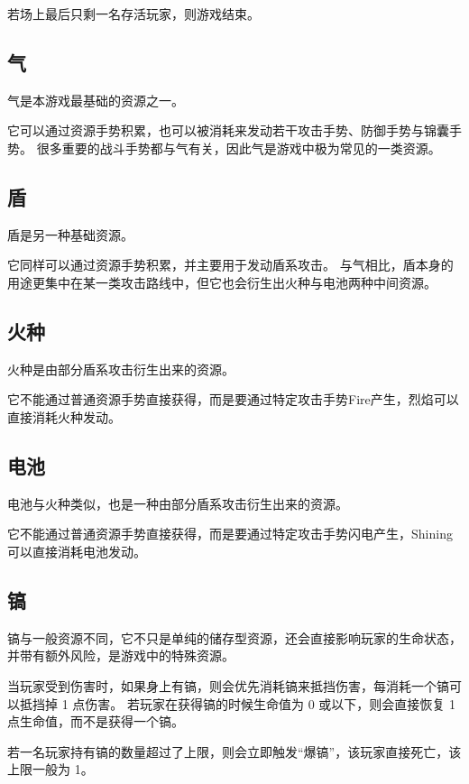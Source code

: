 \documentclass[12pt]{ctexart}
\begin{document}
若场上最后只剩一名存活玩家，则游戏结束。

\subsection{气}

气是本游戏最基础的资源之一。

它可以通过资源手势积累，也可以被消耗来发动若干攻击手势、防御手势与锦囊手势。
很多重要的战斗手势都与气有关，因此气是游戏中极为常见的一类资源。

\subsection{盾}

盾是另一种基础资源。

它同样可以通过资源手势积累，并主要用于发动盾系攻击。
与气相比，盾本身的用途更集中在某一类攻击路线中，但它也会衍生出火种与电池两种中间资源。

\subsection{火种}

火种是由部分盾系攻击衍生出来的资源。

它不能通过普通资源手势直接获得，而是要通过特定攻击手势Fire产生，烈焰可以直接消耗火种发动。

\subsection{电池}

电池与火种类似，也是一种由部分盾系攻击衍生出来的资源。

它不能通过普通资源手势直接获得，而是要通过特定攻击手势闪电产生，Shining可以直接消耗电池发动。

\subsection{镐}

镐与一般资源不同，它不只是单纯的储存型资源，还会直接影响玩家的生命状态，并带有额外风险，是游戏中的特殊资源。

当玩家受到伤害时，如果身上有镐，则会优先消耗镐来抵挡伤害，每消耗一个镐可以抵挡掉 1 点伤害。
若玩家在获得镐的时候生命值为 0 或以下，则会直接恢复 1 点生命值，而不是获得一个镐。

若一名玩家持有镐的数量超过了上限，则会立即触发“爆镐”，该玩家直接死亡，该上限一般为 1。
\end{document}
